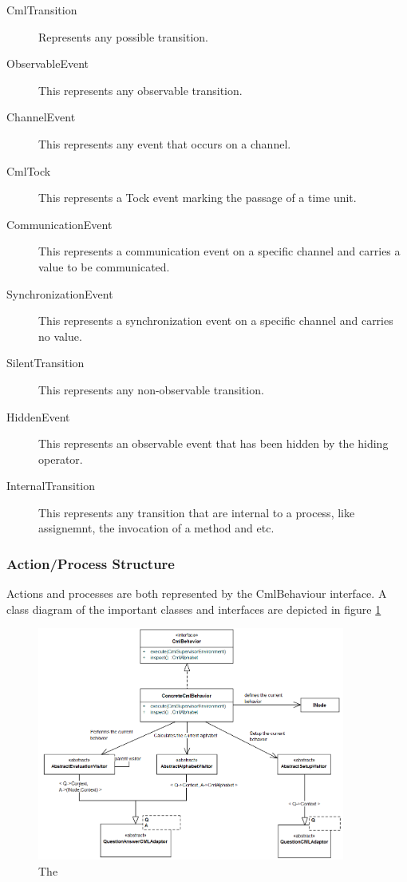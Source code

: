 \documentclass[a4paper, 12pt]{include/compassreport}   %
\begin{document}
\begin{description}
\item[CmlTransition] Represents any possible transition.
\item[ObservableEvent] This represents any observable transition.
\item[ChannelEvent] This represents any event that occurs on a channel.
\item[CmlTock] This represents a Tock event marking the passage of a time unit.
\item[CommunicationEvent] This represents a communication event on a
  specific channel and carries a value to be communicated.
\item[SynchronizationEvent] This represents a synchronization event on
  a specific channel and carries no value.
\item[SilentTransition] This represents any non-observable transition.
\item[HiddenEvent] This represents an observable event that has been hidden by the hiding operator.
\item[InternalTransition] This represents any transition that are
  internal to a process, like assignemnt, the invocation of a method and
  etc.
\end{description}

\subsubsection{Action/Process Structure}
\label{sec:action_process_structure}
Actions and processes are both represented by the CmlBehaviour
interface. A class diagram of the important classes and interfaces are
depicted in figure \ref{fig:cmlbehaviors}
\begin{figure}[ht!]
  \begin{center}
    \includegraphics[width=0.9\textwidth]{figures/CmlBehaviors}
    \caption{The}
    \label{fig:cmlbehaviors}
  \end{center}
\end{figure}
\end{document}
